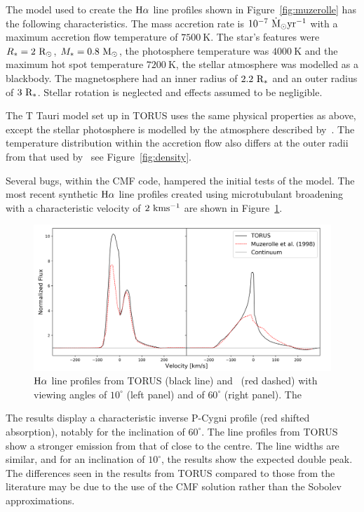 \documentclass[fleqn,usenatbib]{mnras}
\begin{document}
The model used to create the ${\rm H}\alpha$ line profiles shown in Figure~\ref{fig:muzerolle} has the following characteristics. The mass accretion rate is $10^{-7} ~{\rm \dot{M}_{\odot}yr^{-1}}$ with a maximum accretion flow temperature of $7500~\textrm{K}$. The star's features were $R_{\ast}=2~{\rm R_{\odot}}$, $M_{\ast}=0.8~{\rm M_{\odot}}$, the photosphere temperature was $4000~\textrm{K}$ and the maximum hot spot temperature $7200~\textrm{K}$, the stellar atmosphere was modelled as a blackbody. The magnetosphere had an inner radius of $2.2~{\rm R_{\ast}}$ and an outer radius of $3~{\rm R_{\ast}}$. Stellar rotation is neglected and effects assumed to be negligible.

The T Tauri model set up in TORUS uses the same physical properties as above, except the stellar photosphere is modelled by the atmosphere described by~\citet{1979ApJS...40....1K}. The temperature distribution within the accretion flow also differs at the outer radii from that used by~\citet{1998ApJ...492..743M} see Figure~\ref{fig:density}.

Several bugs, within the CMF code, hampered the initial tests of the model. The most recent synthetic ${\rm H}\alpha$ line profiles created using microtubulant broadening with a characteristic velocity of $2~{\rm kms^{-1}}$ are shown in Figure~\ref{fig:bestline}.

\begin{figure}
    \centering
    \includegraphics[width=\linewidth]{figures/results}
    \caption{${\rm H}\alpha$ line profiles from TORUS (black line) and~\citet{1998ApJ...492..743M} (red dashed) with viewing angles of $10^{\circ}$ (left panel) and of $60^{\circ}$ (right panel). The}
    \label{fig:bestline}
\end{figure}

The results display a characteristic inverse P-Cygni profile (red shifted absorption), notably for the inclination of $60^{\circ}$. The line profiles from TORUS show a stronger emission from that of\citep{1998ApJ...492..743M} close to the centre. The line widths are similar, and for an inclination of $10^{\circ}$, the results show the expected double peak. The differences seen in the results from TORUS compared to those from the literature may be due to the use of the CMF solution rather than the Sobolev approximations.
\end{document}
